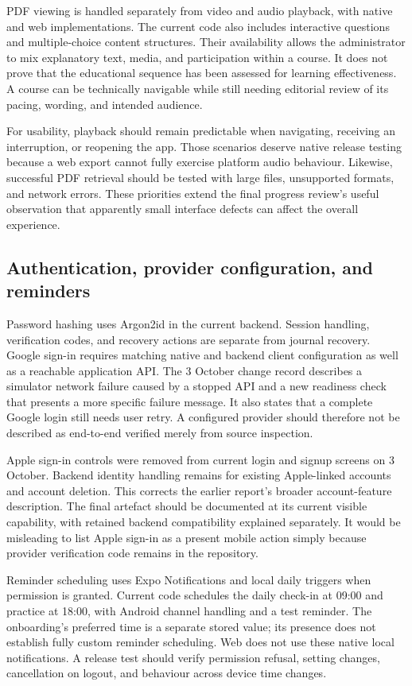 PDF viewing is handled separately from video and audio playback, with native and web implementations. The current code also includes interactive questions and multiple-choice content structures. Their availability allows the administrator to mix explanatory text, media, and participation within a course. It does not prove that the educational sequence has been assessed for learning effectiveness. A course can be technically navigable while still needing editorial review of its pacing, wording, and intended audience.

For usability, playback should remain predictable when navigating, receiving an interruption, or reopening the app. Those scenarios deserve native release testing because a web export cannot fully exercise platform audio behaviour. Likewise, successful PDF retrieval should be tested with large files, unsupported formats, and network errors. These priorities extend the final progress review's useful observation that apparently small interface defects can affect the overall experience.

\subsection{Authentication, provider configuration, and reminders}

Password hashing uses Argon2id in the current backend. Session handling, verification codes, and recovery actions are separate from journal recovery. Google sign-in requires matching native and backend client configuration as well as a reachable application API. The 3 October change record describes a simulator network failure caused by a stopped API and a new readiness check that presents a more specific failure message. It also states that a complete Google login still needs user retry. A configured provider should therefore not be described as end-to-end verified merely from source inspection.

Apple sign-in controls were removed from current login and signup screens on 3 October. Backend identity handling remains for existing Apple-linked accounts and account deletion. This corrects the earlier report's broader account-feature description. The final artefact should be documented at its current visible capability, with retained backend compatibility explained separately. It would be misleading to list Apple sign-in as a present mobile action simply because provider verification code remains in the repository.

Reminder scheduling uses Expo Notifications and local daily triggers when permission is granted. Current code schedules the daily check-in at 09:00 and practice at 18:00, with Android channel handling and a test reminder. The onboarding's preferred time is a separate stored value; its presence does not establish fully custom reminder scheduling. Web does not use these native local notifications. A release test should verify permission refusal, setting changes, cancellation on logout, and behaviour across device time changes.

